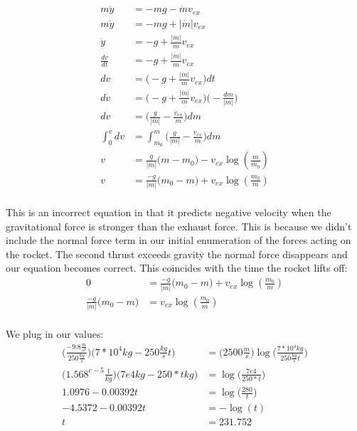 \documentclass[10pt]{article} %
\begin{document}
\begin{align*}
  m\ddot{y} &= -mg - \dot{m}v_{ex}\\
  m\ddot{y} &= -mg + |\dot{m}|v_{ex}\\
  \ddot{y} &= -g + \frac{|\dot{m}|}{m}v_{ex}\\
  \frac{dv}{dt} &= -g + \frac{|\dot{m}|}{m}v_{ex}\\
  dv &= \Big(-g + \frac{|\dot{m}|}{m}v_{ex}\Big)dt\\
  dv &= \Big(-g + \frac{|\dot{m}|}{m}v_{ex}\Big)\Big(-\frac{dm}{|\dot{m}|}\Big)\\
  dv &= \Big(\frac{g}{|\dot{m}|} - \frac{v_{ex}}{m}\Big)dm\\
  \int_0^v dv &= \int_{m_0}^m \Big(\frac{g}{|\dot{m}|} - \frac{v_{ex}}{m}\Big)dm\\
  v &= \frac{g}{|\dot{m}|}\big(m-m_0) - v_{ex}\log(\frac{m}{m_0})\\
  v &= \frac{-g}{|\dot{m}|}\big(m_0-m) + v_{ex}\log(\frac{m_0}{m})\\  
\end{align*}

This is an incorrect equation in that it predicts negative velocity when the gravitational force is stronger than the exhaust force. This is because we didn't include the normal force term in our initial enumeration of the forces acting on the rocket. The second thrust exceeds gravity the normal force disappears and our equation becomes correct. This coincides with the time the rocket lifts off:\\

\begin{align*}
  0 &= \frac{-g}{|\dot{m}|}\big(m_0-m) + v_{ex}\log(\frac{m_0}{m})\\
  \frac{-g}{|\dot{m}|}\big(m_0-m) &= v_{ex}\log(\frac{m_0}{m})\\
\end{align*}

We plug in our values:\\

\begin{align*}
  \Big(\frac{-9.8\frac{m}{s^2}}{250\frac{kg}{s}}\Big)\big(7*10^4kg - 250\frac{kg}{s}t) &= \big(2500\frac{m}{s}\big)\log\Big(\frac{7*10^{4}kg}{250\frac{kg}{s}t}\Big)\\
  \Big(1.568^{e-5}\frac{1}{kg}\Big)\big(7e4 kg - 250*t kg) &= \log\Big(\frac{7e4}{250*t}\Big)\\
  1.0976 - 0.00392t &= \log\Big(\frac{280}{t}\Big)\\
  -4.5372 - 0.00392t &= -\log(t)\\
  t &= 231.752
\end{align*}
\end{document}
